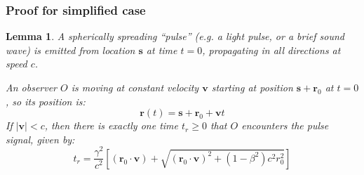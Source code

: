 \documentclass[a4paper]{article}
\theoremstyle{plain}
\newtheorem{lemma}[theorem]{Lemma}
\theoremstyle{definition}
\newcommand{\vect}[1]{\mathbf{#1}}
\begin{document}
\subsubsection{Proof for simplified case}

\begin{lemma}
\label{lem:IntersectingSpreadingPulse2}
A spherically spreading ``pulse'' (e.g. a light pulse, or a brief
sound wave) is emitted from location $\vect{s}$ at time $t=0$,
propagating in all directions at speed $c$.

An observer $O$ is moving at constant velocity $\vect{v}$ starting at
position $\vect{s} + \vect{r}_0$ at $t=0$, so its position is:
\begin{equation}
\vect{r}(t) = \vect{s} + \vect{r}_0 + \vect{v}t
\end{equation}
If $|\vect{v}| < c$, then there is exactly one time $t_r \geq 0$ that
$O$ encounters the pulse signal, given by:
\begin{equation}
t_r = \frac{\gamma^2}{c^2} \left[ (\vect{r}_0 \cdot \vect{v}) + \sqrt{(\vect{r}_0 \cdot \vect{v})^2 + (1-\beta^2)c^2 r_0^2} \right]
\end{equation}
\end{lemma}
\end{document}
